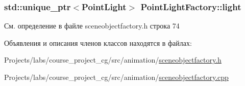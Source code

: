 \subsubsection[{\texorpdfstring{light}{light}}]{\setlength{\rightskip}{0pt plus 5cm}std\+::unique\+\_\+ptr$<${\bf Point\+Light}$>$ Point\+Light\+Factory\+::light\hspace{0.3cm}{\ttfamily [private]}}\hypertarget{class_point_light_factory_a23ff1783d18b5a6274c4e0bc94ad0a3d}{}\label{class_point_light_factory_a23ff1783d18b5a6274c4e0bc94ad0a3d}


См. определение в файле sceneobjectfactory.\+h строка 74



Объявления и описания членов классов находятся в файлах\+:\begin{DoxyCompactItemize}
\item 
Projects/labs/course\+\_\+project\+\_\+cg/src/animation/\hyperlink{sceneobjectfactory_8h}{sceneobjectfactory.\+h}\item 
Projects/labs/course\+\_\+project\+\_\+cg/src/animation/\hyperlink{sceneobjectfactory_8cpp}{sceneobjectfactory.\+cpp}\end{DoxyCompactItemize}
